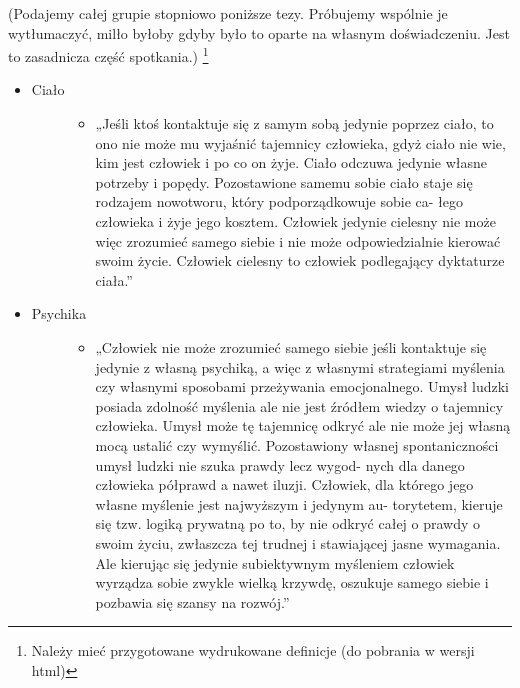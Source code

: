\documentclass[a5paper,10pt,polish]{book}
\begin{document}
(Podajemy całej grupie stopniowo poniższe tezy. Próbujemy wspólnie je wytłumaczyć, milło byłoby gdyby było to oparte na własnym doświadczeniu. Jest to zasadnicza  część spotkania.) \footnote{
Należy mieć przygotowane wydrukowane definicje (do pobrania w wersji html)
}
\begin{itemize}
\item {} \begin{description}
\item[{Ciało}] \leavevmode\begin{itemize}
\item {} 
„Jeśli ktoś kontaktuje się z samym sobą jedynie poprzez ciało, to ono nie może mu wyjaśnić tajemnicy  człowieka, gdyż ciało nie wie, kim jest człowiek i po co on żyje. Ciało odczuwa jedynie własne potrzeby i popędy. Pozostawione samemu sobie ciało staje się rodzajem  nowotworu, który podporządkowuje  sobie ca- łego człowieka i żyje jego kosztem. Człowiek jedynie cielesny nie może więc zrozumieć samego siebie i nie może odpowiedzialnie kierować swoim życie. Człowiek cielesny to człowiek podlegający dyktaturze ciała.”

\end{itemize}

\end{description}

\item {} \begin{description}
\item[{Psychika}] \leavevmode\begin{itemize}
\item {} 
„Człowiek nie może zrozumieć samego siebie jeśli kontaktuje się jedynie z własną psychiką, a więc z własnymi strategiami myślenia czy własnymi sposobami przeżywania emocjonalnego. Umysł ludzki posiada zdolność myślenia ale nie jest źródłem wiedzy o tajemnicy człowieka. Umysł może tę tajemnicę odkryć ale nie może jej własną mocą ustalić czy wymyślić. Pozostawiony własnej spontaniczności umysł ludzki nie szuka prawdy lecz wygod- nych dla danego człowieka półprawd a nawet iluzji.  Człowiek, dla którego jego własne myślenie jest najwyższym i jedynym au- torytetem, kieruje się tzw. logiką prywatną po to, by nie odkryć całej o prawdy o swoim życiu, zwłaszcza tej trudnej i stawiającej jasne wymagania. Ale kierując się jedynie subiektywnym myśleniem człowiek wyrządza sobie zwykle wielką krzywdę, oszukuje samego siebie i pozbawia  się szansy na rozwój.”

\end{itemize}


\end{description}
\end{itemize}
\end{document}
